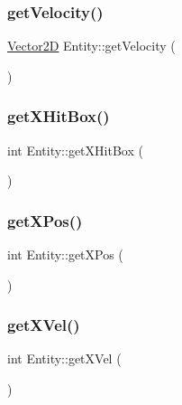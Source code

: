 \subsubsection{\texorpdfstring{get\+Velocity()}{getVelocity()}}
{\footnotesize\ttfamily \hyperlink{_vector2_d_8hpp_aa1f1145650f1dd9bddf7335ec6434d7c}{Vector2D} Entity\+::get\+Velocity (\begin{DoxyParamCaption}{ }\end{DoxyParamCaption})\hspace{0.3cm}{\ttfamily [inline]}}

\mbox{\label{class_entity_a82c547dbbfc7d0f353f3af2d04e17723}} 
\subsubsection{\texorpdfstring{get\+X\+Hit\+Box()}{getXHitBox()}}
{\footnotesize\ttfamily int Entity\+::get\+X\+Hit\+Box (\begin{DoxyParamCaption}{ }\end{DoxyParamCaption})\hspace{0.3cm}{\ttfamily [inline]}}

\mbox{\label{class_entity_a0be9d16acca47749b5450954b7cd8865}} 
\subsubsection{\texorpdfstring{get\+X\+Pos()}{getXPos()}}
{\footnotesize\ttfamily int Entity\+::get\+X\+Pos (\begin{DoxyParamCaption}{ }\end{DoxyParamCaption})\hspace{0.3cm}{\ttfamily [inline]}}

\mbox{\label{class_entity_af10fa675180cfc3c61bf84a9c9c56b3c}} 
\subsubsection{\texorpdfstring{get\+X\+Vel()}{getXVel()}}
{\footnotesize\ttfamily int Entity\+::get\+X\+Vel (\begin{DoxyParamCaption}{ }\end{DoxyParamCaption})\hspace{0.3cm}{\ttfamily [inline]}}

